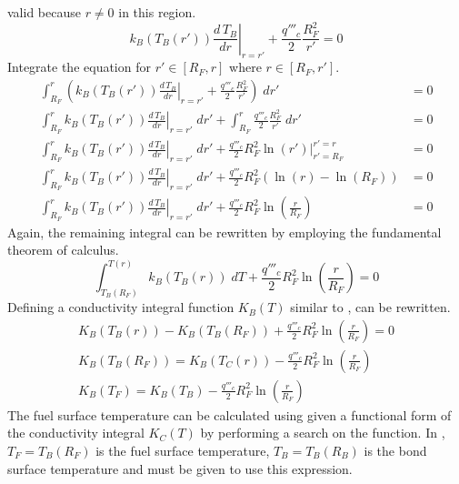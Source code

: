       valid because $r \ne 0$ in this region.
      \begin{equation}
        \left. k_B(T_B(r')) \frac{d\,T_B}{dr} \right|_{r=r'} + 
          \frac{q'''_c}{2} \frac{R_F^2}{r'} = 0
      \end{equation}
      Integrate the equation for $r' \in [R_F,r]$ where $r \in [R_F,r']$.
      \begin{align}
        \int_{R_F}^r \left( \left. k_B(T_B(r')) \frac{d\,T_B}{dr}\right|_{r=r'}
          + \frac{q'''_c}{2} \frac{R_F^2}{r'} \right) \; dr' &= 0 \\
        \int_{R_F}^r \left. k_B(T_B(r')) \frac{d\,T_B}{dr}\right|_{r=r'} \; dr'
          + \int_{R_F}^r \frac{q'''_c}{2} \frac{R_F^2}{r'} \; dr' &= 0\\
        \int_{R_F}^r \left. k_B(T_B(r')) \frac{d\,T_B}{dr}\right|_{r=r'} \; dr'
          + \frac{q'''_c}{2} R_F^2 \left. \ln(r') \right|_{r'=R_F}^{r'=r} &= 0\\
        \int_{R_F}^r \left. k_B(T_B(r')) \frac{d\,T_B}{dr}\right|_{r=r'} \; dr'
          + \frac{q'''_c}{2} R_F^2 ( \ln(r) - \ln(R_F)) &= 0 \\
        \int_{R_F}^r \left. k_B(T_B(r')) \frac{d\,T_B}{dr}\right|_{r=r'} \; dr'
          + \frac{q'''_c}{2} R_F^2 \ln\left(\frac{r}{R_F}\right) &= 0 
      \end{align}
      Again, the remaining integral can be rewritten by employing the
      fundamental theorem of calculus.
      \begin{equation}
        \label{eq:tf_fundamental_theorem}
        \int_{T_B(R_F)}^{T(r)} k_B(T_B(r)) \; dT + \frac{q'''_c}{2} R_F^2 
          \ln\left(\frac{r}{R_F}\right) = 0
      \end{equation}
      Defining a conductivity integral function $K_B(T)$ similar to
      ,  can be
      rewritten.
      \begin{gather}
        K_B(T_B(r)) - K_B(T_B(R_F)) + \frac{q'''_c}{2} R_F^2
          \ln\left(\frac{r}{R_F}\right) = 0 \\
        K_B(T_B(R_F)) = K_B(T_C(r)) - \frac{q'''_c}{2} R_F^2
          \ln\left(\frac{r}{R_F}\right) \\
        \label{eq:tf_conductivity_integral}
        K_B(T_F) = K_B(T_B) - \frac{q'''_c}{2} R_F^2
          \ln\left(\frac{r}{R_F}\right)
      \end{gather}
      The fuel surface temperature can be calculated using
       given a functional form of the
      conductivity integral $K_C(T)$ by performing a search on the function. In
      , $T_F=T_B(R_F)$ is the fuel surface 
      temperature, $T_B=T_B(R_B)$ is the bond surface temperature and must be
      given to use this expression.

